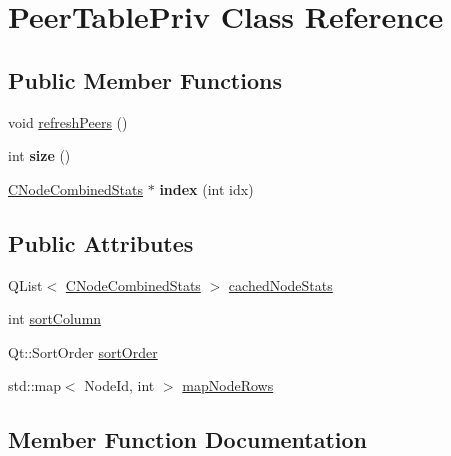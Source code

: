 \hypertarget{class_peer_table_priv}{}\section{Peer\+Table\+Priv Class Reference}
\label{class_peer_table_priv}
\subsection*{Public Member Functions}
\begin{DoxyCompactItemize}
\item 
void \mbox{\hyperlink{class_peer_table_priv_a304d99874f6cd0c67ed207546a5ca904}{refresh\+Peers}} ()
\item 
\mbox{\label{class_peer_table_priv_abc703185b3067489b0d5ad22c2147112}} 
int {\bfseries size} ()
\item 
\mbox{\label{class_peer_table_priv_a58c817cce967ddd5ae4bad622bfaecb4}} 
\mbox{\hyperlink{struct_c_node_combined_stats}{C\+Node\+Combined\+Stats}} $\ast$ {\bfseries index} (int idx)
\end{DoxyCompactItemize}
\subsection*{Public Attributes}
\begin{DoxyCompactItemize}
\item 
Q\+List$<$ \mbox{\hyperlink{struct_c_node_combined_stats}{C\+Node\+Combined\+Stats}} $>$ \mbox{\hyperlink{class_peer_table_priv_a8da9d0256d11f205dfa1cdce86843761}{cached\+Node\+Stats}}
\item 
int \mbox{\hyperlink{class_peer_table_priv_a4917597853d2d5f0055be017b8ab33c5}{sort\+Column}}
\item 
Qt\+::\+Sort\+Order \mbox{\hyperlink{class_peer_table_priv_adb95d4bbc4fb13a21a360108aeca5c32}{sort\+Order}}
\item 
std\+::map$<$ Node\+Id, int $>$ \mbox{\hyperlink{class_peer_table_priv_ae27db14bcbe769f494c4db56ef27fb08}{map\+Node\+Rows}}
\end{DoxyCompactItemize}


\subsection{Member Function Documentation}
\mbox{\label{class_peer_table_priv_a304d99874f6cd0c67ed207546a5ca904}} 
